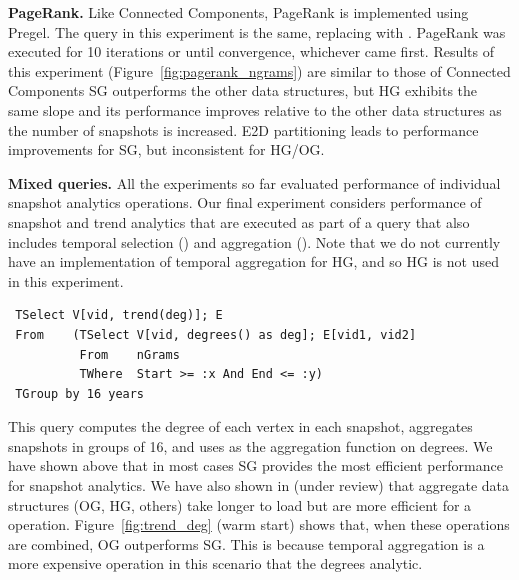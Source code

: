 
{\bf PageRank.} Like Connected Components, PageRank is implemented
using Pregel.  The query in this experiment is the same, replacing
 with .  PageRank was executed for
10 iterations or until convergence, whichever came first.  Results of
this experiment (Figure~\ref{fig:pagerank_ngrams}) are similar to
those of Connected Components SG outperforms the other data
structures, but HG exhibits the same slope and its performance
improves relative to the other data structures as the number of
snapshots is increased.  E2D partitioning leads to performance
improvements for SG, but inconsistent for HG/OG.


{\bf Mixed queries.} All the experiments so far evaluated performance
of individual \ql snapshot analytics operations.  Our final experiment
considers performance of snapshot and trend analytics that are
executed as part of a query that also includes temporal selection
() and aggregation ().  Note that we do
not currently have an implementation of temporal aggregation for HG,
and so HG is not used in this experiment.

\begin{small}
\begin{verbatim}
 TSelect V[vid, trend(deg)]; E
 From    (TSelect V[vid, degrees() as deg]; E[vid1, vid2]
          From    nGrams
          TWhere  Start >= :x And End <= :y)
 TGroup by 16 years
\end{verbatim}
\end{small}

This query computes the degree of each vertex in each snapshot,
aggregates snapshots in groups of 16, and uses  as the
aggregation function on degrees.  We have shown above that in most
cases SG provides the most efficient performance for snapshot
analytics.  We have also shown in (under review) that aggregate data
structures (OG, HG, others) take longer to load but are more efficient
for a  operation.  Figure~\ref{fig:trend_deg} (warm
start) shows that, when these operations are combined, OG outperforms
SG.  This is because temporal aggregation is a more expensive
operation in this scenario that the degrees analytic.

